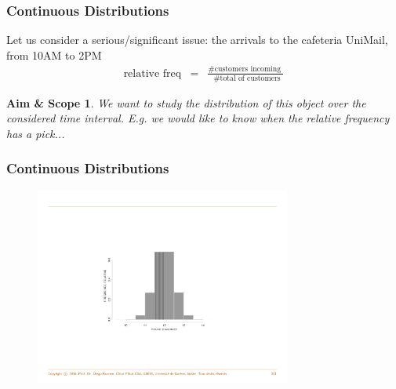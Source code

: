 \documentclass[notes=show,smaller,handout]{beamer}
\newtheorem{aes}{Aim \& Scope}[section]
\begin{document}
\begin{frame}%

\frametitle{Continuous Distributions}

\begin{example}[Cafeteria]
Let us consider a serious/significant issue: the arrivals to the cafeteria UniMail, from 10AM to 2PM
\begin{eqnarray*}
\mbox{relative freq}&=& \frac{\mbox{\# customers incoming }}{\mbox{ \# total of customers}}
\end{eqnarray*}

\begin{aes}
We want to study the distribution of this object over the considered time interval. E.g. we would like to know when the relative frequency has a pick...
\end{aes}

\end{example}
\end{frame}

\begin{frame}%

\frametitle{Continuous Distributions}
\begin{example}[cont'd]
\begin{figure}[ptb]\centering
\includegraphics[width=0.75\textwidth,height=0.75\textheight]{hist1.pdf}
\end{figure}
\end{example}
\end{frame}
\end{document}
